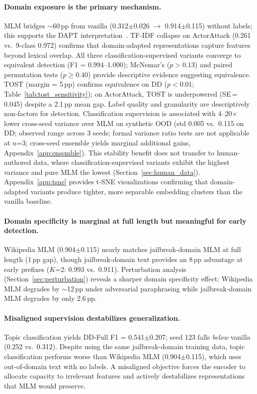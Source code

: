 \paragraph{Domain exposure is the primary mechanism.}
MLM bridges $\sim$60\,pp from vanilla (0.312$\pm$0.026 $\to$ 0.914$\pm$0.115) without labels; this supports the DAPT interpretation~\citep{gururangan2020dontstop}. TF-IDF collapse on ActorAttack (0.261 vs.\ 9-class 0.972) confirms that domain-adapted representations capture features beyond lexical overlap.
All three classification-supervised variants converge to equivalent detection (F1 = 0.994--1.000); McNemar's ($p > 0.13$) and paired permutation tests ($p \geq 0.40$) provide descriptive evidence suggesting equivalence. TOST (margin = 5\,pp) confirms equivalence on DD ($p < 0.01$; Table~\ref{tab:tost_sensitivity}); on ActorAttack, TOST is underpowered (SE\,=\,0.045) despite a 2.1\,pp mean gap. Label quality and granularity are descriptively non-factors for detection.
Classification supervision is associated with 4--20$\times$ lower cross-seed variance over MLM on synthetic OOD (std 0.005 vs.\ 0.115 on DD; observed range across 3 seeds; formal variance ratio tests are not applicable at $n$=3; cross-seed ensemble yields marginal additional gains, Appendix~\ref{app:ensemble}). This stability benefit does not transfer to human-authored data, where classification-supervised variants exhibit the highest variance and pure MLM the lowest (Section~\ref{sec:human_data}).
Appendix~\ref{app:tsne} provides t-SNE visualizations confirming that domain-adapted variants produce tighter, more separable embedding clusters than the vanilla baseline.

\paragraph{Domain specificity is marginal at full length but meaningful for early detection.}
Wikipedia MLM (0.904$\pm$0.115) nearly matches jailbreak-domain MLM at full length (1\,pp gap), though jailbreak-domain text provides an 8\,pp advantage at early prefixes ($K$=2: 0.993 vs.\ 0.911).
Perturbation analysis (Section~\ref{sec:perturbation}) reveals a sharper domain specificity effect: Wikipedia MLM degrades by $\sim$12\,pp under adversarial paraphrasing while jailbreak-domain MLM degrades by only 2.6\,pp.

\paragraph{Misaligned supervision destabilizes generalization.}
Topic classification yields DD-Full F1 = 0.541$\pm$0.207; seed 123 falls \emph{below} vanilla (0.252 vs.\ 0.312). Despite using the same jailbreak-domain training data, topic classification performs worse than Wikipedia MLM (0.904$\pm$0.115), which uses out-of-domain text with no labels. A misaligned objective forces the encoder to allocate capacity to irrelevant features and actively destabilizes representations that MLM would preserve.

